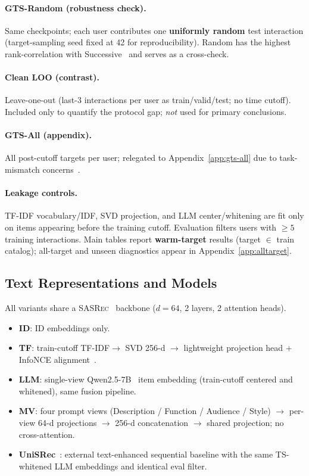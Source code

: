 \documentclass[sigconf,natbib=true,anonymous]{acmart}
\newcommand{\tfidf}{\textsc{TF-IDF}\xspace}
\newcommand{\base}{\textsc{SASRec}\xspace}
\begin{document}
\paragraph{GTS-Random (robustness check).}
Same checkpoints; each user contributes one \textbf{uniformly random} test interaction (target-sampling seed fixed at 42 for reproducibility).
Random has the highest rank-correlation with Successive~\cite{liang2024timetosplit} and serves as a cross-check.

\paragraph{Clean LOO (contrast).}
Leave-one-out (last-3 interactions per user as train/valid/test; no time cutoff).
Included only to quantify the protocol gap; \emph{not} used for primary conclusions.

\paragraph{GTS-All (appendix).}
All post-cutoff targets per user; relegated to Appendix~\ref{app:gts-all} due to task-mismatch concerns~\cite{liang2024timetosplit}.

\paragraph{Leakage controls.}
\tfidf vocabulary/IDF, SVD projection, and LLM center/whitening are fit only on items appearing before the training cutoff.
Evaluation filters users with $\ge 5$ training interactions.
Main tables report \textbf{warm-target} results (target $\in$ train catalog); all-target and unseen diagnostics appear in Appendix~\ref{app:alltarget}.

\subsection{Text Representations and Models}
\label{sec:models}

All variants share a \base~\cite{kang2018sasrec} backbone ($d{=}64$, 2 layers, 2 attention heads).

\begin{itemize}[leftmargin=*,itemsep=1pt]
\item \textbf{ID}: ID embeddings only.
\item \textbf{TF}: train-cutoff \tfidf $\to$ SVD 256-d $\to$ lightweight projection head + InfoNCE alignment~\cite{oord2018cpc}.
\item \textbf{LLM}: single-view Qwen2.5-7B~\cite{qwen2024qwen25} item embedding (train-cutoff centered and whitened), same fusion pipeline.
\item \textbf{MV}: four prompt views (Description / Function / Audience / Style) $\to$ per-view 64-d projections $\to$ 256-d concatenation $\to$ shared projection; no cross-attention.
\item \textbf{UniSRec}~\cite{hou2022unisrec}: external text-enhanced sequential baseline with the same TS-whitened LLM embeddings and identical eval filter.
\end{itemize}
\end{document}
